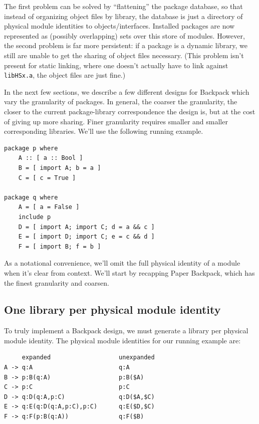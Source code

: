 \documentclass{article}
\begin{document}
The first problem can be solved by ``flattening'' the package database,
so that instead of organizing object files by library, the database
is just a directory of physical module identities to objects/interfaces.
Installed packages are now represented as (possibly overlapping) sets over
this store of modules.  However, the second problem is far more persistent:
if a package is a dynamic library, we still are unable to get the sharing of
object files necessary. (This problem isn't present for static linking, where
one doesn't actually have to link against \verb|libHSx.a|, the object files
are just fine.)

In the next few sections, we describe a few different designs for Backpack which
vary the granularity of packages.  In general, the coarser the granularity,
the closer to the current package-library correspondence the design is, but
at the cost of giving up more sharing.  Finer granularity requires smaller
and smaller corresponding libraries.  We'll use the following running example.

\begin{verbatim}
package p where
    A :: [ a :: Bool ]
    B = [ import A; b = a ]
    C = [ c = True ]

package q where
    A = [ a = False ]
    include p
    D = [ import A; import C; d = a && c ]
    E = [ import D; import C; e = c && d ]
    F = [ import B; f = b ]
\end{verbatim}

As a notational convenience, we'll omit the full physical identity of a
module when it's clear from context.  We'll start by recapping Paper Backpack,
which has the finest granularity and coarsen.

\subsection{One library per physical module identity}

To truly implement a Backpack design, we must generate a library per
physical module identity.  The physical module identities for
our running example are:

\begin{verbatim}
     expanded                   unexpanded
A -> q:A                        q:A
B -> p:B(q:A)                   p:B($A)
C -> p:C                        p:C
D -> q:D(q:A,p:C)               q:D($A,$C)
E -> q:E(q:D(q:A,p:C),p:C)      q:E($D,$C)
F -> q:F(p:B(q:A))              q:F($B)
\end{verbatim}
\end{document}

